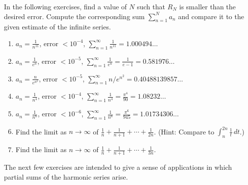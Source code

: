 \documentclass{exercises}
\begin{document}
In the following exercises, find a value of $N$ such that $R_{N}$ is smaller than the desired error. Compute the corresponding sum $\sum_{n=1}^{N}a_{n}$ and compare it to the given estimate of the infinite series.

\begin{enumerate}[resume]
\item $a_{n}=\frac{1}{n^{11}}$, error $<10^{-4}$, $\sum_{n=1}^{\infty}\frac{1}{n^{11}}=1.000494\ldots$
\item $a_{n}=\frac{1}{e^{n}}$, error $<10^{-5}$, $\sum_{n=1}^{\infty}\frac{1}{e^{n}}=\frac{1}{e-1}=0.581976\ldots$
\item $a_{n}=\frac{n}{e^{n^{2}}}$, error $<10^{-5}$, $\sum_{n=1}^{\infty}n/e^{n^{2}}=0.40488139857\ldots$
\item $a_{n}=\frac{1}{n^{4}}$, error $<10^{-4}$, $\sum_{n=1}^{\infty}\frac{1}{n^{4}}=\frac{\pi^{4}}{90}=1.08232\ldots$
\item $a_{n}=\frac{1}{n^{6}}$, error $<10^{-6}$, $\sum_{n=1}^{\infty}\frac{1}{n^{6}}=\frac{\pi^{6}}{945}=1.01734306\ldots$
\item Find the limit as $n\to \infty$ of $\frac{1}{n}+\frac{1}{n+1}+\cdots+\frac{1}{2n}$. (Hint: Compare to $\int_{n}^{2n}\frac{1}{t}\,dt$.)
\item Find the limit as $n\to \infty$ of $\frac{1}{n}+\frac{1}{n+1}+\cdots+\frac{1}{3n}$.
\end{enumerate}

The next few exercises are intended to give a sense of applications in which partial sums of the harmonic series arise.
\end{document}
